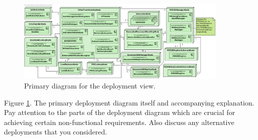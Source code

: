 \begin{figure}
    \centering
    \includegraphics[width=0.9\textwidth]{figures/Deployment.png}
    \caption{Primary diagram for the deployment view.}\label{fig:depl_primary}
\end{figure}


Figure \ref{fig:depl_primary}. The primary deployment diagram itself and accompanying explanation.
Pay attention to the parts of the deployment diagram which are crucial for
achieving certain non-functional requirements.
Also discuss any alternative deployments that you considered.